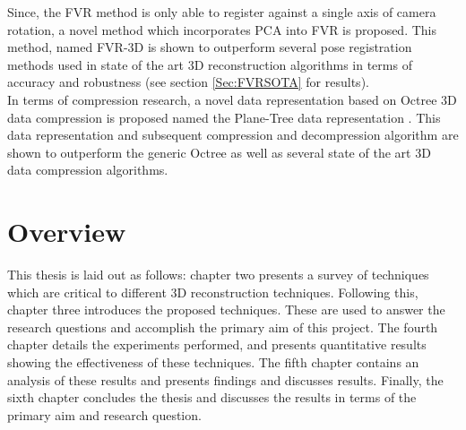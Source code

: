 Since, the FVR method is only able to register against a single axis of camera rotation, a novel method which incorporates PCA into FVR is proposed. This method, named FVR-3D is shown to outperform several pose registration methods used in state of the art 3D reconstruction algorithms in terms of accuracy and robustness (see section \ref{Sec:FVRSOTA} for results). \\

In terms of compression research, a novel data representation based on Octree 3D data compression is proposed named the Plane-Tree data representation \cite{Lincoln15Plane}. This data representation and subsequent compression and decompression algorithm are shown to outperform the generic Octree as well as several state of the art 3D data compression algorithms. \\


\section{Overview}

This thesis is laid out as follows: chapter two presents a survey of techniques which are critical to different 3D reconstruction techniques. Following this, chapter three introduces the proposed techniques. These are used to answer the research questions and accomplish the primary aim of this project. The fourth chapter details the experiments performed, and presents quantitative results showing the effectiveness of these techniques. The fifth chapter contains an analysis of these results and presents findings and discusses results. Finally, the sixth chapter concludes the thesis and discusses the results in terms of the primary aim and research question. 


